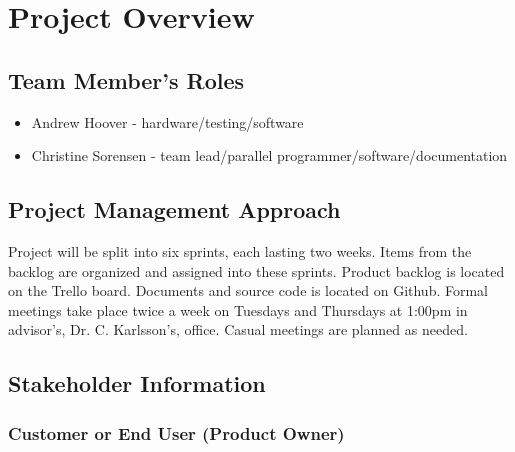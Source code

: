 

\chapter{Project Overview}



\section{Team Member's Roles}
\begin{itemize}
	\item Andrew Hoover - hardware/testing/software 
	\item Christine Sorensen - team lead/parallel programmer/software/documentation
\end{itemize}

\section{Project  Management Approach}
Project will be split into six sprints, each lasting two weeks. Items from the backlog are organized and assigned into these sprints. \newline \newline Product backlog is located on the Trello board. Documents and source code is located on Github. \newline \newline Formal meetings take place twice a week on Tuesdays and Thursdays at 1:00pm in advisor's, Dr. C. Karlsson's, office. Casual meetings are planned as needed.


\section{ Stakeholder Information}



\subsection{Customer or End User (Product Owner)}

